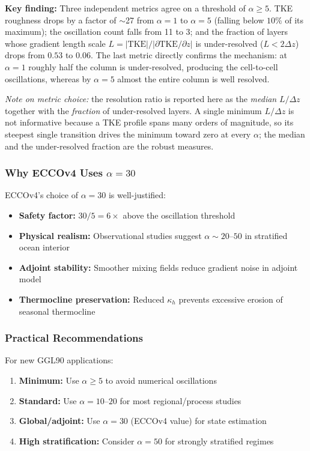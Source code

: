 \documentclass[12pt,letterpaper]{article}
\newcommand{\TKE}{\mathrm{TKE}}
\begin{document}
\textbf{Key finding:} Three independent metrics agree on a threshold of \textbf{$\alpha \geq 5$}. TKE roughness drops by a factor of $\sim$27 from $\alpha=1$ to $\alpha=5$ (falling below $10\%$ of its maximum); the oscillation count falls from 11 to 3; and the fraction of layers whose gradient length scale $L=|\TKE|/|\partial \TKE/\partial z|$ is under-resolved ($L<2\Delta z$) drops from $0.53$ to $0.06$. The last metric directly confirms the mechanism: at $\alpha=1$ roughly half the column is under-resolved, producing the cell-to-cell oscillations, whereas by $\alpha=5$ almost the entire column is well resolved.

\textit{Note on metric choice:} the resolution ratio is reported here as the \emph{median} $L/\Delta z$ together with the \emph{fraction} of under-resolved layers. A single minimum $L/\Delta z$ is not informative because a TKE profile spans many orders of magnitude, so its steepest single transition drives the minimum toward zero at every $\alpha$; the median and the under-resolved fraction are the robust measures.

\subsubsection{Why ECCOv4 Uses $\alpha = 30$}

ECCOv4's choice of $\alpha = 30$ is well-justified:

\begin{itemize}
\item \textbf{Safety factor:} $30 / 5 = 6\times$ above the oscillation threshold
\item \textbf{Physical realism:} Observational studies suggest $\alpha \sim 20$--$50$ in stratified ocean interior
\item \textbf{Adjoint stability:} Smoother mixing fields reduce gradient noise in adjoint model
\item \textbf{Thermocline preservation:} Reduced $\kappa_h$ prevents excessive erosion of seasonal thermocline
\end{itemize}

\subsubsection{Practical Recommendations}

For new GGL90 applications:

\begin{enumerate}
\item \textbf{Minimum:} Use $\alpha \geq 5$ to avoid numerical oscillations
\item \textbf{Standard:} Use $\alpha = 10$--$20$ for most regional/process studies
\item \textbf{Global/adjoint:} Use $\alpha = 30$ (ECCOv4 value) for state estimation
\item \textbf{High stratification:} Consider $\alpha = 50$ for strongly stratified regimes
\end{enumerate}
\end{document}
